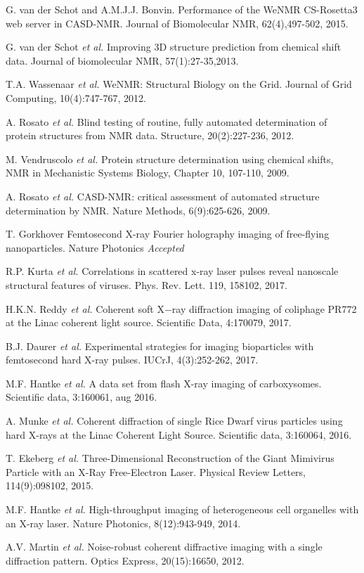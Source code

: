\documentclass{UUThesisTemplate}
\begin{document}
    \begin{listofsupportingpapers}
	\item G. van der Schot and A.M.J.J. Bonvin. Performance of the WeNMR CS-Rosetta3 web server in CASD-NMR. Journal of Biomolecular NMR, 62(4),497-502, 2015.	
	\item G. van der Schot \textit{et al.} Improving 3D structure prediction from chemical shift data. Journal of biomolecular NMR, 57(1):27-35,2013.
	\item T.A. Wassenaar \textit{et al.} WeNMR: Structural Biology on the Grid. Journal of Grid Computing, 10(4):747-767, 2012.
	\item A. Rosato    \textit{et al.} Blind testing of routine, fully automated determination of protein structures from NMR data. Structure, 20(2):227-236, 2012.
	\item M. Vendruscolo \textit{et al.} Protein structure
determination using chemical shifts, NMR in Mechanistic Systems Biology, Chapter 10, 107-110, 2009.
 	\item A. Rosato    \textit{et al.} CASD-NMR: critical assessment of automated structure determination by NMR. Nature Methods, 6(9):625-626, 2009.
 	\item T. Gorkhover Femtosecond X-ray Fourier holography imaging of free-flying nanoparticles. Nature Photonics \textit{Accepted}
 	\item R.P. Kurta   \textit{et al.} Correlations in scattered x-ray laser pulses reveal nanoscale structural features of viruses. Phys. Rev. Lett. 119, 158102, 2017.
	\item H.K.N. Reddy \textit{et al.} Coherent soft X$-$ray diffraction imaging of coliphage PR772 at the Linac coherent light source. Scientific Data, 4:170079, 2017.
	\item  B.J. Daurer \textit{et al.} Experimental strategies for imaging bioparticles with femtosecond hard X-ray pulses. IUCrJ, 4(3):252-262, 2017.
	\item M.F. Hantke  \textit{et al.} A data set from flash X-ray imaging of carboxysomes. Scientific data, 3:160061, aug 2016.
	\item A. Munke     \textit{et al.} Coherent diffraction of single Rice Dwarf virus particles using hard X-rays at the Linac Coherent Light Source. Scientific data, 3:160064, 2016.
	\item T. Ekeberg   \textit{et al.} Three-Dimensional Reconstruction of the Giant Mimivirus Particle with an X-Ray Free-Electron Laser. Physical Review Letters, 114(9):098102, 2015.
	\item M.F. Hantke  \textit{et al.} High-throughput imaging of heterogeneous cell organelles with an X-ray laser. Nature Photonics, 8(12):943-949, 2014.
	\item A.V. Martin  \textit{et al.} Noise-robust coherent diffractive imaging with a single diffraction pattern. Optics Express, 20(15):16650, 2012.	
    \end{listofsupportingpapers}
\end{document}
